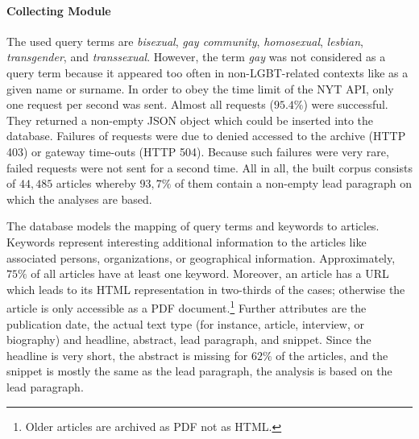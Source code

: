 \documentclass[10pt,a4paper,twocolumn]{scrartcl}
\begin{document}
\paragraph*{Collecting Module} The used query terms are \textit{bisexual}, \textit{gay community}, \textit{homosexual}, \textit{lesbian}, \textit{transgender}, and \textit{transsexual}. However, the term \textit{gay} was not considered as a query term because it appeared too often in non-LGBT-related contexts like as a given name or surname. In order to obey the time limit of the NYT API, only one request per second was sent. Almost all requests ($95.4\%$) were successful. They returned a non-empty JSON object which could be inserted into the database. Failures of requests were due to denied accessed to the archive (HTTP 403) or gateway time-outs (HTTP 504). Because such failures were very rare, failed requests were not sent for a second time. All in all, the built corpus consists of $44,485$ articles whereby $93,7\%$ of them contain a non-empty lead paragraph on which the analyses are based.

The database models the mapping of query terms and keywords to articles. Keywords represent interesting additional information to the articles like associated persons, organizations, or geographical information. Approximately, $75\%$ of all articles have at least one keyword. Moreover, an article has a URL which leads to its HTML representation in two-thirds of the cases; otherwise the article is only accessible as a PDF document.\footnote{Older articles are archived as PDF not as HTML.} Further attributes are the publication date, the actual text type (for instance, article, interview, or biography) and headline, abstract, lead paragraph, and snippet. Since the headline is very short, the abstract is missing for $62\%$ of the articles, and the snippet is mostly the same as the lead paragraph, the analysis is based on the lead paragraph.
\end{document}
